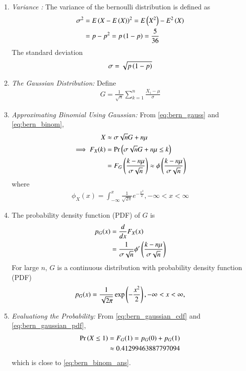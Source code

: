 \begin{enumerate}[label=\thesubsection.\arabic*
,ref=\thesection.\theenumi]
\item {\em Variance :}  The variance of the bernoulli distribution is defined as
\begin{align}
\sigma^2 &= E\left(X-E\left(X\right)\right)^2  = E\left(X^2\right)-E^2\left(X\right) 
\\
&=p-p^2 = p\left(1-p\right) = \frac{5}{36}
\end{align}
%
The standard deviation 
\begin{align}
\sigma =  \sqrt{p\left(1-p\right)}
\end{align}
%
\item {\em The Gaussian Distribution: }  Define
\begin{align}
\label{eq:bern_gauss}
G = \frac{1}{\sqrt{n}}\sum_{k=1}^{n}\frac{X_i-\mu}{\sigma}
\end{align}
%
\item {\em Approximating Binomial Using Gaussian: } From \eqref{eq:bern_gauss}
and \eqref{eq:bern_binom},
%
\begin{align}
X & \approx \sigma\sqrt{n}G + n\mu 
\\
\implies F_X(k) &= \Pr\left(\sigma\sqrt{n}G + n\mu  \le k \right)
\\
 &= F_G\left(\frac{k-n\mu}{\sigma\sqrt{n}}\right) \approx \phi\left(\frac{k-n\mu}{\sigma\sqrt{n}}\right) 
\label{eq:bern_gaussian_cdf}
\end{align}
where 
\begin{align}
\phi_{X}(x) = \int^{x}_{-\infty} \frac{1}{\sqrt{2\pi}}e^{-\frac{x^2}{2}}, -\infty < x < \infty
\end{align}
\item The 
probability density function (PDF) 
of $G$ is
%
\begin{align}
p_{G}(x) &= \frac{d}{dx}F_{X}(x)
\\
 &=  \frac{1}{{\sigma\sqrt{n}}}\phi^{\prime}\left(\frac{k-n\mu}{\sigma\sqrt{n}}\right) 
\label{eq:bern_gaussian_pdf}
\end{align}
%
For large $n$, $G$ is a continuous distribution with probability density function (PDF)
\begin{align}
p_G(x) =  \frac{1}{\sqrt{2\pi}}\exp\left(-\frac{x^2}{2}\right), -\infty < x < \infty,
\end{align}
%
\item {\em Evaluationg the Probability: }  From \ref{eq:bern_gaussian_cdf}
and \ref{eq:bern_gaussian_pdf},
\begin{align}
\Pr\left(X \le 1 \right) &= F_{G}(1) = p_G(0)+p_G(1) 
\\
&\approx 
0.41299463887797094
\label{eq:bern_gauss_ans}
\end{align}
which is close to \eqref{eq:bern_binom_ans}.
%
\end{enumerate}
